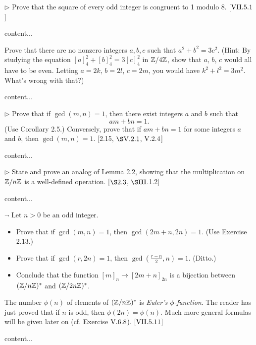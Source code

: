 \begin{exercise}
	$\triangleright$ Prove that the square of every odd integer is congruent to 1 modulo 8. [$\RNo{7}.5.1$]
\end{exercise}
\begin{solution}
	content...
\end{solution}

\begin{exercise}
	Prove that there are no nonzero integers $a,b,c$ such that $a^2 + b^2 = 3c^2$. (Hint: By studying the equation $[a]_4^2 + [b]_4^2 = 3[c]_4^2$ in $\mathbb{Z}/4\mathbb{Z}$, show that $a$, $b$, $c$ would all have to be even. Letting $a = 2k$, $b= 2l$, $c = 2m$, you would have $k^2 + l^2 = 3m^2$. What's wrong with that?)
\end{exercise}
\begin{solution}
	content...
\end{solution}

\begin{exercise}
	$\triangleright$ Prove that if $\gcd(m,n) = 1$, then there exist integers $a$ and $b$ such that 
	\[
		am + bn = 1.
	\]
	(Use Corollary 2.5.) Conversely, prove that if $am+bn = 1$ for some integers $a$ and $b$, then $\gcd(m,n) = 1$. [2.15, $\S \RNo{5}.2.1$, $\RNo{5}.2.4$]
\end{exercise}
\begin{solution}
	content...
\end{solution}

\begin{exercise}
	$\triangleright$ State and prove an analog of Lemma 2.2, showing that the multiplication on $\mathbb{Z}/n\mathbb{Z}$ is a well-defined operation. [$\S 2.3$, $\S \RNo{3}$.1.2]
\end{exercise}
\begin{solution}
	content...
\end{solution}

\begin{exercise}
	$\neg$ Let $n > 0$ be an odd integer.
	\begin{itemize}
		\item Prove that if $\gcd(m,n) = 1$, then $\gcd(2m+n, 2n) = 1$. (Use Exercise 2.13.)
		\item Prove that if $\gcd(r,2n) = 1$, then $\gcd(\frac{r-n}{2}, n ) = 1$. (Ditto.)
		\item Conclude that the function $[m]_n \to [2m + n]_{2n}$ is a bijection between $(\mathbb{Z}/n\mathbb{Z})^*$ and $(\mathbb{Z}/2n\mathbb{Z})^*$.
	\end{itemize}
	The number $\phi(n)$ of elements of $(\mathbb{Z}/n\mathbb{Z})^*$ is \emph{Euler's $\phi$-function}. The reader has just proved that if $n$ is odd, then $\phi(2n) = \phi(n)$. Much more general formulas will be given later on (cf. Exercise $\RNo{5}.6.8$). [$\RNo{7}.5.11$]
\end{exercise}
\begin{solution}
	content...
\end{solution}


